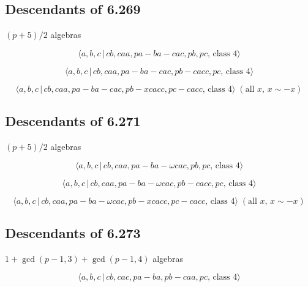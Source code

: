\documentclass[10pt]{article}
\begin{document}
\subsection{Descendants of 6.269}

$(p+5)/2$ algebras

\begin{equation}
\langle a,b,c\,|\,cb,caa,pa-ba-cac,pb,pc,\,\text{class }4\rangle 
\tag{7.2216}
\end{equation}

\begin{equation}
\langle a,b,c\,|\,cb,caa,pa-ba-cac,pb-cacc,pc,\,\text{class }4\rangle 
\tag{7.2217}
\end{equation}

\begin{equation}
\langle a,b,c\,|\,cb,caa,pa-ba-cac,pb-xcacc,pc-cacc,\,\text{class }4\rangle
\;(\text{all }x,\,x\sim -x)  \tag{7.2218}
\end{equation}

\subsection{Descendants of 6.271}

$(p+5)/2$ algebras

\begin{equation}
\langle a,b,c\,|\,cb,caa,pa-ba-\omega cac,pb,pc,\,\text{class }4\rangle 
\tag{7.2219}
\end{equation}

\begin{equation}
\langle a,b,c\,|\,cb,caa,pa-ba-\omega cac,pb-cacc,pc,\,\text{class }4\rangle
\tag{7.2220}
\end{equation}

\begin{equation}
\langle a,b,c\,|\,cb,caa,pa-ba-\omega cac,pb-xcacc,pc-cacc,\,\text{class }%
4\rangle \;(\text{all }x,\,x\sim -x)  \tag{7.2221}
\end{equation}

\subsection{Descendants of 6.273}

$1+\gcd (p-1,3)+\gcd (p-1,4)$ algebras

\begin{equation}
\langle a,b,c\,|\,cb,cac,pa-ba,pb-caa,pc,\,\text{class }4\rangle 
\tag{7.2222}
\end{equation}
\end{document}
